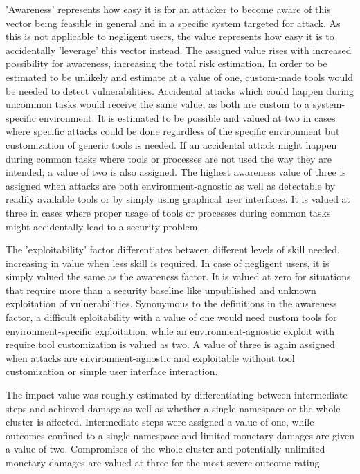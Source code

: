 'Awareness' represents how easy it is for an attacker to become aware of this vector being feasible in general and in a specific system targeted for attack. As this is not applicable to negligent users, the value represents how easy it is to accidentally 'leverage' this vector instead. The assigned value rises with increased possibility for awareness, increasing the total risk estimation.
In order to be estimated to be unlikely and estimate at a value of one, custom-made tools would be needed to detect vulnerabilities. Accidental attacks which could happen during uncommon tasks would receive the same value, as both are custom to a system-specific environment. It is estimated to be possible and valued at two in cases where specific attacks could be done regardless of the specific environment but customization of generic tools is needed. If an accidental attack might happen during common tasks where tools or processes are not used the way they are intended, a value of two is also assigned.
The highest awareness value of three is assigned when attacks are both environment-agnostic as well as detectable by readily available tools or by simply using graphical user interfaces. It is valued at three in cases where proper usage of tools or processes during common tasks might accidentally lead to a security problem.

The 'exploitability' factor differentiates between different levels of skill needed, increasing in value when less skill is required. In case of negligent users, it is simply valued the same as the awareness factor. It is valued at zero for situations that require more than a security baseline like unpublished and unknown exploitation of vulnerabilities. Synonymous to the definitions in the awareness factor, a difficult eploitability with a value of one would need custom tools for environment-specific exploitation, while an environment-agnostic exploit with require tool customization is valued as two. A value of three is again assigned when attacks are environment-agnostic and exploitable without tool customization or simple user interface interaction.

The impact value was roughly estimated by differentiating between intermediate steps and achieved damage as well as whether a single namespace or the whole cluster is affected. Intermediate steps were assigned a value of one, while outcomes confined to a single namespace and limited monetary damages are given a value of two. Compromises of the whole cluster and potentially unlimited monetary damages are valued at three for the most severe outcome rating.

